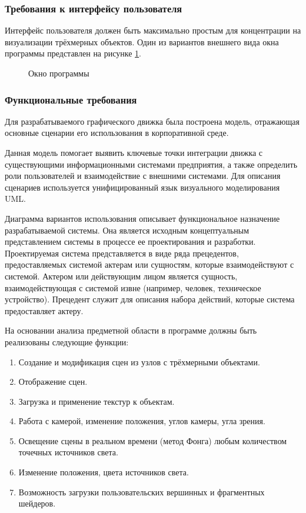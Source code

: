 \subsubsection{Требования к интерфейсу пользователя}

Интерфейс пользователя должен быть максимально простым для концентрации на визуализации трёхмерных объектов. Один из вариантов внешнего вида окна программы представлен на рисунке \ref{interface:image}.

\begin{figure}[ht]
\caption{Окно программы}
\label{interface:image}
\end{figure}

\subsubsection{Функциональные требования}

Для разрабатываемого графического движка была построена модель, отражающая основные сценарии его использования в корпоративной среде.

Данная модель помогает выявить ключевые точки интеграции движка с существующими информационными системами предприятия, а также определить роли пользователей и взаимодействие с внешними системами. Для описания сценариев используется унифицированный язык визуального моделирования UML.

Диаграмма вариантов использования описывает функциональное назначение разрабатываемой системы. Она является исходным концептуальным представлением системы в процессе ее проектирования и разработки. Проектируемая система представляется в виде ряда прецедентов, предоставляемых системой актерам или сущностям, которые взаимодействуют с системой. Актером или действующим лицом является сущность, взаимодействующая с системой извне (например, человек, техническое устройство). Прецедент служит для описания набора действий, которые система предоставляет актеру.

На основании анализа предметной области в программе должны быть реализованы следующие функции:

\begin{enumerate}
    \item Создание и модификация сцен из узлов с трёхмерными объектами.
    \item Отображение сцен.
    \item Загрузка и применение текстур к объектам.
    \item Работа с камерой, изменение положения, углов камеры, угла зрения.
    \item Освещение сцены в реальном времени (метод Фонга) любым количеством точечных источников света.
    \item Изменение положения, цвета источников света.
    \item Возможность загрузки пользовательских вершинных и фрагментных шейдеров.
\end{enumerate}

